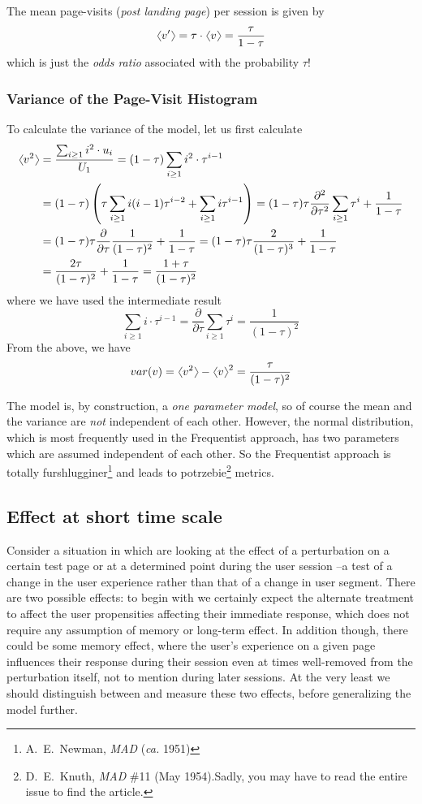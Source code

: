 \documentclass[12pt]{report}
\newcommand{\beq}{\begin{equation}} %
\newcommand{\eeq}{\end{equation}} %
\newcommand{\bdm}{\begin{displaymath}} %
\newcommand{\edm}{\end{displaymath}} %
\newcommand{\firstpartial}[1]{\frac{\partial}{\partial #1}}
\newcommand{\secondpartial}[1]{\frac{\partial^2}{\partial #1^2}}
\newcommand{\sumge}[2]{\sum_{#1\ge #2}}
\newcommand{\langl}{\begin{picture}(4.5,7)
\put(1.1,2.5){\rotatebox{60}{\line(1,0){5.5}}}
\put(1.1,2.5){\rotatebox{300}{\line(1,0){5.5}}}
\end{picture}}
\newcommand{\rangl}{\begin{picture}(4.5,7)
\put(.9,2.5){\rotatebox{120}{\line(1,0){5.5}}}
\put(.9,2.5){\rotatebox{240}{\line(1,0){5.5}}}
\end{picture}}
\newcommand{\mymean}[1]{\ensuremath{\langl{#1}\rangl}} %
\begin{document}
The mean page-visits ({\em post landing page}) per session is given by
\beq\label{eq:mean_pv}
\mymean{v'} = \tau\cdot\mymean{v} = \frac{\tau}{1-\tau}
\eeq
which is just the {\em odds ratio} associated with the probability \(\tau\)!

\subsubsection{Variance of the Page-Visit Histogram}
To calculate the variance of the model, let us first calculate
\beq
\begin{split}
  \mymean{v^2} &= \frac{\sumge{i}{1}i^2\cdot u_i}{U_1}= (1-\tau)\sumge{i}{1} i^2 \cdot \tau^{i-1}\\
  &=(1-\tau)\left( \tau\sumge{i}{1}i(i-1)\tau^{i-2} + \sumge{i}{1}i \tau^{i-1}\right)
  =(1-\tau)\tau\secondpartial{\tau}\sumge{i}{1} \tau^i + \frac{1}{1-\tau}\\
  &=(1-\tau)\tau\firstpartial{\tau}\frac{1}{(1-\tau)^2} + \frac{1}{1-\tau}= (1-\tau)\tau\frac{2}{(1-\tau)^3}+\frac{1}{1-\tau}\\
  &= \frac{2\tau}{(1-\tau)^2}+\frac{1}{1-\tau} = \frac{1+\tau}{(1-\tau)^2}
\end{split}
\eeq
where we have used the intermediate result
\bdm
\sumge{i}{1}i\cdot \tau^{i-1} = \firstpartial{\tau}\sumge{i}{1}\tau^i = \frac{1}{(1-\tau)^2}
  \edm
From the above, we have
\bdm
var(v) = \mymean{v^2}-\mymean{v}^2 = \frac{\tau}{(1-\tau)^2}
\edm

The model is, by construction, a {\em one parameter model}, so of
course the mean and the variance are {\em not} independent of each
other. However, the normal distribution, which is most frequently used
in the Frequentist approach, has two parameters which are assumed
independent of each other. So the Frequentist approach is totally
furshlugginer\footnote{A.~E.~Newman, {\em MAD} ({\em ca.} 1951)} and
leads to potrzebie\footnote{D.~E.~Knuth, {\em MAD} \#11 (May
  1954).Sadly, you may have to read the entire issue to find the
  article.} metrics.

\subsection{Effect at short time scale}\label{sec:shorttime}
Consider a situation in which are looking at the effect of a
perturbation on a certain test page or at a determined point during
the user session --a test of a change in the user experience rather
than that of a change in user segment. There are two possible effects:
to begin with we certainly expect the alternate treatment to affect
the user propensities affecting their immediate response, which does
not require any assumption of memory or long-term effect. In addition
though, there could be some memory effect, where the user's experience
on a given page influences their response during their session even at
times well-removed from the perturbation itself, not to mention during
later sessions. At the very least we should distinguish between and
measure these two effects, before generalizing the model further.
\end{document}
